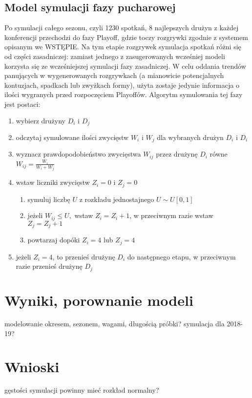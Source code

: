 \documentclass[inzynierska]{pwr_wmat_praca_dyplomowa}
\theoremstyle{plain}
\numberwithin{theorem}{chapter}
\theoremstyle{definition}
\numberwithin{theorem}{chapter}
\begin{document}
\section{Model symulacji fazy pucharowej}
Po symulacji całego sezonu, czyli 1230 spotkań, 8 najlepszych drużyn z każdej konferencji przechodzi do fazy Playoff, gdzie toczy rozgrywki zgodnie z systemem opisanym we WSTĘPIE. Na tym etapie rozgrywek symulacja spotkań różni się od części zasadniczej: zamiast jednego z zasugerowanych wcześniej modeli korzysta się ze wcześniejszej symulacji fazy zasadniczej. W celu oddania trendów panujących w wygenerowanych rozgrywkach (a mianowicie potencjalnych kontuzjach, spadkach lub zwyżkach formy), użyta zostaje jedynie informacja o ilości wygranych przed rozpoczęciem Playoffów. Algorytm symulowania tej fazy jest postaci:
\begin{enumerate}
	\item wybierz drużyny $D_i$ i $D_j$
	\item odczytaj symulowane ilości zwycięstw $W_i$ i $W_j$ dla wybranych drużyn $D_i$ i $D_i$
	\item wyznacz prawdopodobieństwo zwycięstwa $W_{ij}$ przez drużynę  $D_i$ równe $W_{ij}=\frac{W_i}{W_i + W_j}$ 
	\item wstaw liczniki zwycięstw $Z_i=0$ i $Z_j=0$ 
		\begin{enumerate}
			\item symuluj liczbę $U$ z rozkładu jednostajnego $U\sim U[0,1]$ 
			\item jeżeli $W_{ij} \leq U,$ wstaw $Z_i=Z_i+1$, w przeciwnym razie wstaw $Z_j=Z_j+1$
			\item powtarzaj dopóki  $Z_i=4$ lub $Z_j=4$
		\end{enumerate}
	\item jeżeli $Z_i=4$, to przenieś drużynę $D_i$ do następnego etapu, w przeciwnym razie przenieś drużynę $D_j$
	
\end{enumerate} 

\chapter{Wyniki, porownanie modeli}
modelowanie okresem, sezonem, wagami, długością próbki?
symulacja dla 2018-19?
\chapter{Wnioski}
gęstości symulacji powinny mieć rozkład normalny?
\end{document}
